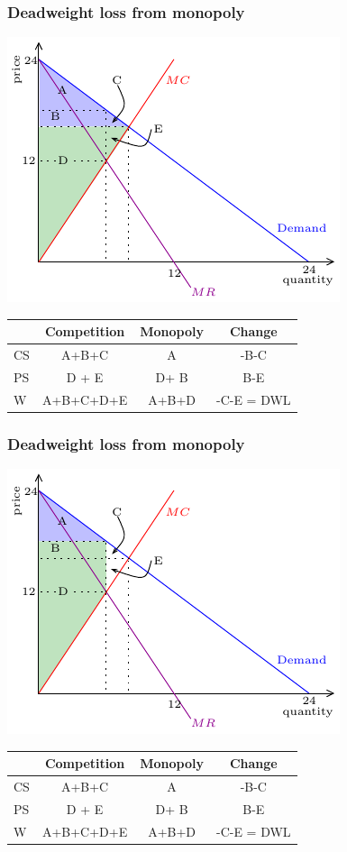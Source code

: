 \documentclass[xcolor=pdftex,dvipsnames]{beamer}
\begin{document}
\begin{frame}
  \frametitle{Deadweight loss from monopoly}
  \begin{center}
    \includegraphics{pics/DWLc}

  {\scriptsize
    \begin{tabular}{lccc}
\hline      & Competition & Monopoly & Change\\
\hline      CS & A+B+C &{\color{white} A }&{\color{white} -B-C}\\
\hline      PS & D + E &{\color{white}  D+ B} & {\color{white}  B-E} \\
\hline      W & A+B+C+D+E & {\color{white} A+B+D} & {\color{white} -C-E = DWL}\\\hline
    \end{tabular}
  }
  \end{center}\end{frame}
\begin{frame}
  \frametitle{Deadweight loss from monopoly}
  \begin{center}
    \includegraphics{pics/DWLm}

  {\scriptsize
    \begin{tabular}{lccc}
\hline      & Competition & Monopoly & Change\\
\hline      CS & A+B+C &A &{\color{white} -B-C}\\
\hline      PS & D + E & D+ B & {\color{white}  B-E} \\
\hline      W & A+B+C+D+E &  A+B+D & {\color{white} -C-E = DWL}\\\hline
    \end{tabular}
  }
  \end{center}\end{frame}
\end{document}
